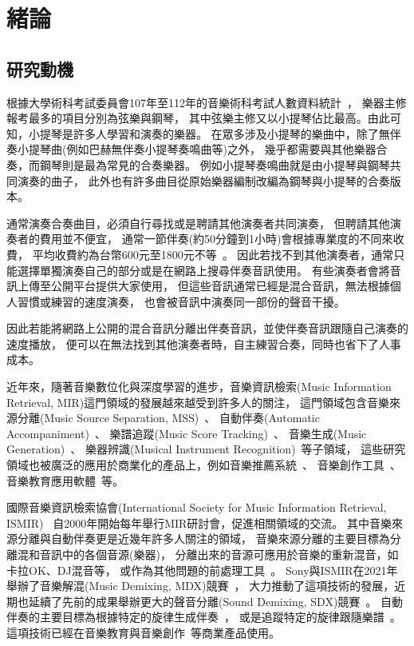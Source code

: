 \documentclass[class=NCU_thesis, crop=false]{standalone}
\begin{document}
\chapter{緒論}
\section{研究動機}

根據大學術科考試委員會107年至112年的音樂術科考試人數資料統計~\cite{CAPE2024Statistics}，
樂器主修報考最多的項目分別為弦樂與鋼琴，
其中弦樂主修又以小提琴佔比最高。由此可知，小提琴是許多人學習和演奏的樂器。
在眾多涉及小提琴的樂曲中，除了無伴奏小提琴曲(例如巴赫無伴奏小提琴奏鳴曲等)之外，
幾乎都需要與其他樂器合奏，而鋼琴則是最為常見的合奏樂器。
例如小提琴奏鳴曲就是由小提琴與鋼琴共同演奏的曲子，
此外也有許多曲目從原始樂器編制改編為鋼琴與小提琴的合奏版本。

通常演奏合奏曲目，必須自行尋找或是聘請其他演奏者共同演奏，
但聘請其他演奏者的費用並不便宜，
通常一節伴奏(約50分鐘到1小時)會根據專業度的不同來收費，
平均收費約為台幣600元至1800元不等~\cite{2020PianoAccompanistHourlySalary}。
因此若找不到其他演奏者，通常只能選擇單獨演奏自己的部分或是在網路上搜尋伴奏音訊使用。
有些演奏者會將音訊上傳至公開平台提供大家使用，
但這些音訊通常已經是混合音訊，無法根據個人習慣或練習的速度演奏，
也會被音訊中演奏同一部份的聲音干擾。

因此若能將網路上公開的混合音訊分離出伴奏音訊，並使伴奏音訊跟隨自己演奏的速度播放，
便可以在無法找到其他演奏者時，自主練習合奏，同時也省下了人事成本。

近年來，隨著音樂數位化與深度學習的進步，音樂資訊檢索(Music Information Retrieval, MIR)這門領域的發展越來越受到許多人的關注，
這門領域包含音樂來源分離(Music Source Separation, MSS)~\cite{défossez2021music, Cano2019Musical, Rafii2018Overview}、
自動伴奏(Automatic Accompaniment)~\cite{davies2007towards, li2020application, zhang2023design}、
樂譜追蹤(Music Score Tracking)~\cite{orio2003score, dorfer2016towards}、
音樂生成(Music Generation)~\cite{ji2020comprehensive, hernandez2022music}、
樂器辨識(Musical Instrument Recognition)~\cite{solanki2022music, racharla2020predominant, manilow2020hierarchical}等子領域，
這些研究領域也被廣泛的應用於商業化的產品上，例如音樂推薦系統~\cite{Mangla2023Spotify}、
音樂創作工具~\cite{Ableton2024Ableton11, Apple2024LogicPro, PreSonus2024StudioOne}、
音樂教育應用軟體~\cite{Ronimusic2024Amazing, FORSCORE2024forScore}等。

國際音樂資訊檢索協會(International Society for Music Information Retrieval, ISMIR)~\cite{ISMIR2024InternationalSociety}
自2000年開始每年舉行MIR研討會，促進相關領域的交流。
其中音樂來源分離與自動伴奏更是近幾年許多人關注的領域，
音樂來源分離的主要目標為分離混和音訊中的各個音源(樂器)，
分離出來的音源可應用於音樂的重新混音，如卡拉OK、DJ混音等，
或作為其他問題的前處理工具~\cite{zhao2022research}。
Sony與ISMIR在2021年舉辦了音樂解混(Music Demixing, MDX)競賽~\cite{Yuki_Mitsufuji2021MusicDemixing}，
大力推動了這項技術的發展，近期也延續了先前的成果舉辦更大的聲音分離(Sound Demixing, SDX)競賽~\cite{Fabbro_Giorgio2023TheSoundDemixing}。
自動伴奏的主要目標為根據特定的旋律生成伴奏~\cite{wang2022songdriver, ding2023museflow}，
或是追蹤特定的旋律跟隨樂譜~\cite{brazier2021improving}。
這項技術已經在音樂教育與音樂創作~\cite{Antescofo2024metronautapp}等商業產品使用。
\end{document}
